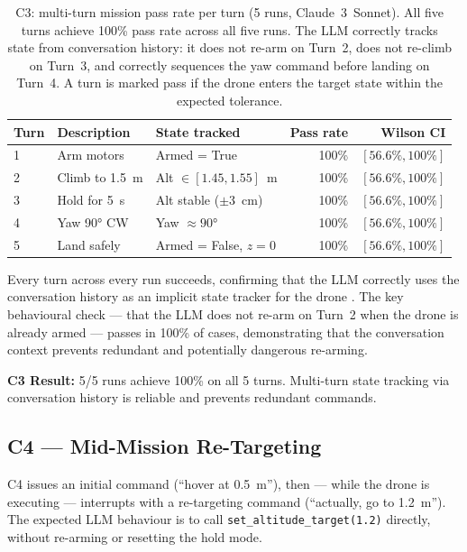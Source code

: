 \begin{table}[ht]
  \caption{C3: multi-turn mission pass rate per turn (5 runs, Claude~3~Sonnet).
    All five turns achieve 100\% pass rate across all five runs. The LLM
    correctly tracks state from conversation history: it does not re-arm
    on Turn~2, does not re-climb on Turn~3, and correctly sequences the
    yaw command before landing on Turn~4. A turn is marked pass if the
    drone enters the target state within the expected tolerance.}
  \label{tab:ch3_c3}
  \centering
  \small
  \begin{tabular}{lllrr}
    \toprule
    Turn & Description & State tracked & Pass rate & Wilson CI \\
    \midrule
    1 & Arm motors           & Armed = True              & 100\% & $[56.6\%, 100\%]$ \\
    2 & Climb to 1.5~m       & Alt $\in [1.45, 1.55]$~m & 100\% & $[56.6\%, 100\%]$ \\
    3 & Hold for 5~s         & Alt stable ($\pm$3~cm)   & 100\% & $[56.6\%, 100\%]$ \\
    4 & Yaw 90° CW           & Yaw $\approx 90°$        & 100\% & $[56.6\%, 100\%]$ \\
    5 & Land safely          & Armed = False, $z=0$     & 100\% & $[56.6\%, 100\%]$ \\
    \bottomrule
  \end{tabular}
\end{table}

Every turn across every run succeeds, confirming that the LLM correctly uses
the conversation history as an implicit state tracker for the drone
\cite{huang2022innermonologue}. The key behavioural check --- that the LLM
does not re-arm on Turn~2 when the drone is already armed --- passes in
100\% of cases, demonstrating that the conversation context prevents
redundant and potentially dangerous re-arming.

\textbf{C3 Result:} 5/5 runs achieve 100\% on all 5 turns. Multi-turn
state tracking via conversation history is reliable and prevents redundant
commands.

\subsection{C4 --- Mid-Mission Re-Targeting}
\label{sec:ch3_c4}

C4 issues an initial command (``hover at 0.5~m''), then --- while the drone
is executing --- interrupts with a re-targeting command (``actually, go to
1.2~m''). The expected LLM behaviour is to call \texttt{set\_altitude\_target(1.2)}
directly, without re-arming or resetting the hold mode.


